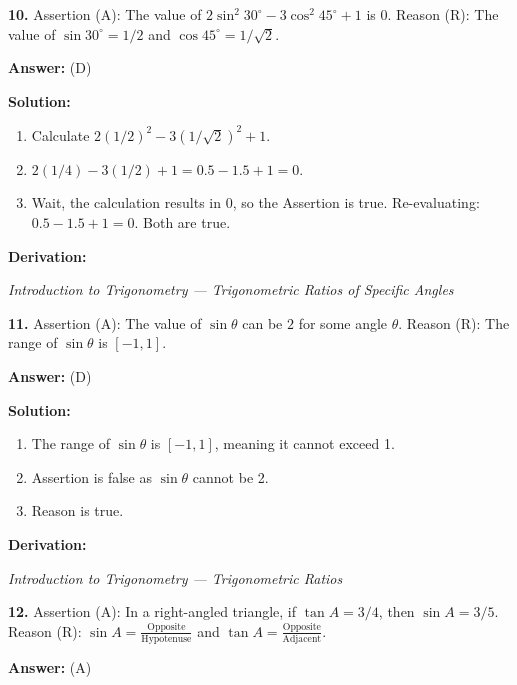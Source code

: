 \documentclass[12pt,a4paper]{exam}
\newcommand{\fitmath}[1]{%
  \sbox{\schmathbox}{$\displaystyle #1$}%
  \ifdim\wd\schmathbox>\linewidth
    \resizebox{\linewidth}{!}{\usebox{\schmathbox}}%
  \else
    \usebox{\schmathbox}%
  \fi}
\begin{document}
\begin{questions}
\question \textbf{10.} Assertion (A): The value of $2 \sin^2 30^\circ - 3 \cos^2 45^\circ + 1$ is $0$. 
Reason (R): The value of $\sin 30^\circ = 1/2$ and $\cos 45^\circ = 1/\sqrt{2}$.

\textbf{Answer:}
(D)

\textbf{Solution:}
\begin{enumerate}
  \item Calculate $2(1/2)^2 - 3(1/\sqrt{2})^2 + 1$.
  \item $2(1/4) - 3(1/2) + 1 = 0.5 - 1.5 + 1 = 0$.
  \item Wait, the calculation results in 0, so the Assertion is true. Re-evaluating: $0.5 - 1.5 + 1 = 0$. Both are true.
\end{enumerate}
\textbf{Derivation:}
\begin{center}
\fitmath{2(\frac{1}{4}) - 3(\frac{1}{2}) + 1 = \frac{1}{2} - \frac{3}{2} + 1 = -1 + 1 = 0}
\end{center}
\hfill \textit{Introduction to Trigonometry — Trigonometric Ratios of Specific Angles}
\vspace{0.3cm}

\question \textbf{11.} Assertion (A): The value of $\sin \theta$ can be $2$ for some angle $\theta$. 
Reason (R): The range of $\sin \theta$ is $[-1, 1]$.

\textbf{Answer:}
(D)

\textbf{Solution:}
\begin{enumerate}
  \item The range of $\sin \theta$ is $[-1, 1]$, meaning it cannot exceed 1.
  \item Assertion is false as $\sin \theta$ cannot be 2.
  \item Reason is true.
\end{enumerate}
\textbf{Derivation:}
\begin{center}
\fitmath{-1 \le \sin \theta \le 1}
\end{center}
\hfill \textit{Introduction to Trigonometry — Trigonometric Ratios}
\vspace{0.3cm}

\question \textbf{12.} Assertion (A): In a right-angled triangle, if $\tan A = 3/4$, then $\sin A = 3/5$. 
Reason (R): $\sin A = \frac{\text{Opposite}}{\text{Hypotenuse}}$ and $\tan A = \frac{\text{Opposite}}{\text{Adjacent}}$.

\textbf{Answer:}
(A)


\end{questions}
\end{document}
